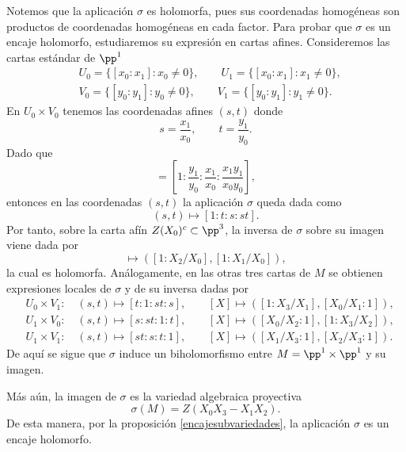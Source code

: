 \begin{example}
		Notemos que la aplicación $\sigma$ es holomorfa, pues sus coordenadas homogéneas son productos de coordenadas homogéneas en cada factor. Para probar que $\sigma$ es un encaje holomorfo, estudiaremos su expresión en cartas afines. Consideremos las cartas estándar de $\pp^1$
		\begin{align*}
			&U_0=\{[x_0:x_1]:x_0\neq 0\},\qquad U_1=\{[x_0:x_1]:x_1\neq 0\},\\
			&V_0=\{[y_0:y_1]:y_0\neq 0\},\qquad V_1=\{[y_0:y_1]:y_1\neq 0\}.
		\end{align*}
		En $U_0\times V_0$ tenemos las coordenadas afines $(s,t)$ donde
		\begin{equation*}
			s=\frac{x_1}{x_0},\qquad t=\frac{y_1}{y_0}.
		\end{equation*}
		Dado que 
		\begin{equation*}
			[x_0y_0:x_0y_1:x_1y_0:x_1y_1]=\left[ 1:\frac{y_1}{y_0}:\frac{x_1}{x_0}:\frac{x_1y_1}{x_0y_0}\right],
		\end{equation*}
		entonces en las coordenadas $(s,t)$ la aplicación $\sigma$ queda dada como
		\begin{equation*}
			(s,t)\longmapsto [1:t:s:st].
		\end{equation*}
		Por tanto, sobre la carta afín $Z(X_0)^c\subset\pp^3$, la inversa de $\sigma$ sobre su imagen viene dada por
		\begin{equation*}
			[X_0:X_1:X_2:X_3]\longmapsto \left([1:X_2/X_0],[1:X_1/X_0]\right),
		\end{equation*}
		la cual es holomorfa. Análogamente, en las otras tres cartas de $M$ se obtienen expresiones locales de $\sigma$ y de su inversa dadas por
		\begin{align*}
			&U_0\times V_1:\quad (s,t)\mapsto [t:1:st:s],\qquad
			[X]\mapsto \left([1:X_3/X_1],[X_0/X_1:1]\right),\\
			&U_1\times V_0:\quad (s,t)\mapsto [s:st:1:t],\qquad
			[X]\mapsto \left([X_0/X_2:1],[1:X_3/X_2]\right),\\
			&U_1\times V_1:\quad (s,t)\mapsto [st:s:t:1],\qquad
			[X]\mapsto \left([X_1/X_3:1],[X_2/X_3:1]\right).
		\end{align*}
		De aquí se sigue que $\sigma$ induce un biholomorfismo entre $M=\pp^1\times\pp^1$ y su imagen.
		
		Más aún, la imagen de $\sigma$ es la variedad algebraica proyectiva
		\begin{equation*}
			\sigma(M)=Z(X_0X_3-X_1X_2).
		\end{equation*}
		De esta manera, por la proposición \ref{encajesubvariedades}, la aplicación $\sigma$ es un encaje holomorfo.
		

\end{example}
